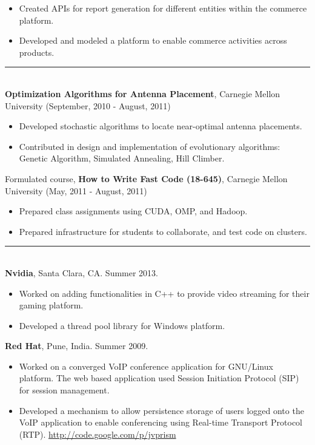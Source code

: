\documentclass[a4paper,oneside,english]{article}
\begin{document}
\begin{itemize}
	\itemsep0em
	\item Created APIs for report generation for different entities within the commerce platform. 
	\item Developed and modeled a platform to enable commerce activities across products.
\end{itemize}
\noindent\rule{6in}{0.4pt} \\[4pt]
 \textbf{Optimization Algorithms for Antenna Placement}, Carnegie Mellon University (September, 2010 - August, 2011) 
\begin{itemize}
	\itemsep0em
	\item Developed stochastic algorithms to locate near-optimal antenna placements.
	\item Contributed in design and implementation of evolutionary algorithms: Genetic Algorithm, Simulated Annealing, Hill Climber.
\end{itemize} \vspace*{2mm}
Formulated course, \textbf{How to Write Fast Code (18-645)}, Carnegie Mellon University (May, 2011 - August, 2011) 
\begin{itemize}
	\itemsep0em
	\item Prepared class assignments using CUDA, OMP, and Hadoop.
	\item Prepared infrastructure for students to collaborate, and test code on clusters.
\end{itemize}
\noindent\rule{6in}{0.4pt} \\[4pt]
 \textbf{Nvidia}, Santa Clara, CA. Summer 2013. 
\begin{itemize}
	\itemsep0em
	\item Worked on adding functionalities in C++ to provide video streaming for their gaming platform. 
	\item Developed a thread pool library for Windows platform. 
\end{itemize} \vspace*{2mm}
\noindent\textbf{Red Hat}, Pune, India. Summer 2009.
\begin{itemize}
	\itemsep0em
	\item Worked on a converged VoIP conference application for GNU/Linux platform. The web based application used Session Initiation Protocol (SIP) for session management. 
	\item Developed a mechanism to allow persistence storage of users logged onto the VoIP application to enable conferencing using Real-time Transport Protocol (RTP). \url{http://code.google.com/p/jvprism}
\end{itemize}
\end{document}
